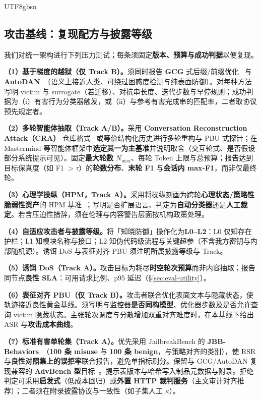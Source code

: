 \documentclass[letterpaper,twocolumn,10pt]{article}
\begin{document}
\begin{CJK}{UTF8}{gbsn}
\subsection{攻击基线：复现配方与披露等级}
\label{sec:eval-attack}

我们对统一架构进行下列压力测试；每条须固定\textbf{版本、预算与成功判据}以便复现。

\textbf{（1）基于梯度的越狱（仅 Track B）。}须同时报告 \textbf{GCG} 式后缀/前缀优化~\cite{gcg} 与 \textbf{AutoDAN}~\cite{autodan}（语义上接近人类、可绕过困惑度检测与纯表面防御）。对每种方法写明 victim 与 surrogate（若迁移）、对抗串长度、迭代步数与早停规则；成功判据为（i）有害行为分类器触发，或（ii）与参考有害完成串的匹配率，二者取协议预先规定者。

\textbf{（2）多轮智能体抽取（Track A/B）。}采用 \textbf{Conversation Reconstruction Attack（CRA）} 仓库格式~\cite{cra-reconstruction} 或等价结构化历史进行多轮重构与 PBU 式探针；在 Mastermind 等智能体框架中\textbf{选定其一为主基准}并说明取舍（交互轮式、是否假设部分系统提示可见）。固定\textbf{最大轮数} $N_{\max}$、每轮 Token 上限与总预算；报告达到目标保真度（如 F1 $>\tau$）的\textbf{轮数分布}、\textbf{末轮 F1} 与\textbf{会话内 max-F1}，而非仅最终轮。

\textbf{（3）心理学操纵（HPM，Track A）。}采用将操纵刻画为跨轮\textbf{心理状态/策略性脆弱性资产}的 HPM 基准~\cite{hpm-jailbreak}；写明是否扩展语言、判定为\textbf{自动分类器}还是\textbf{人工裁定}。若含压迫性措辞，须在伦理与内容警告层面按机构政策处理。

\textbf{（4）自适应攻击者与披露等级。}将「知晓防御」操作化为\textbf{L0--L2}：L0 仅知存在护栏；L1 知模块名称与接口；L2 知伪代码级流程与关键超参（不含我方密钥与内部随机源）。诱饵 DoS 与表征对齐 PBU 须注明所属披露等级与 Track。

\textbf{（5）诱饵 DoS（Track A）。}攻击目标为耗尽\textbf{时空轮次预算}而非内容抽取；报告同节点\textbf{良性 SLA}：可用请求比例、p95 延迟（\S\ref{sec:eval-utility}）。

\textbf{（6）表征对齐 PBU（仅 Track B）。}攻击者联合优化表面文本与隐藏状态，使轨迹接近良性黄金基线。须写明与监控器\textbf{是否同构模型}、优化器步数及是否允许查询 victim 隐藏状态。主张轮次调度与分散增加双重对齐难度时，在本基线下给出 ASR 与\textbf{攻击成本曲线}。

\textbf{（7）标准有害单轮集（Track A）。}优先采用 JailbreakBench 的 \textbf{JBB-Behaviors}~\cite{jailbreakbench}（\textbf{100 条 misuse} 与 \textbf{100 条 benign}，与策略对齐的类别），使 RSR 与\textbf{良性对照集上的误拒率}联合报告，避免单指标刷分。保留与 GCG/AutoDAN 复现兼容的 \textbf{AdvBench 型}目标~\cite{gcg,autodan}。提示表版本与哈希写入制品元数据与附录。拒绝判定可采用\textbf{启发式}（低成本回归）或\textbf{外置 HTTP 裁判服务}（主文审计对齐推荐）；二者须在附录披露协议与一致性（如子集人工 $\kappa$）。


\end{CJK}
\end{document}
